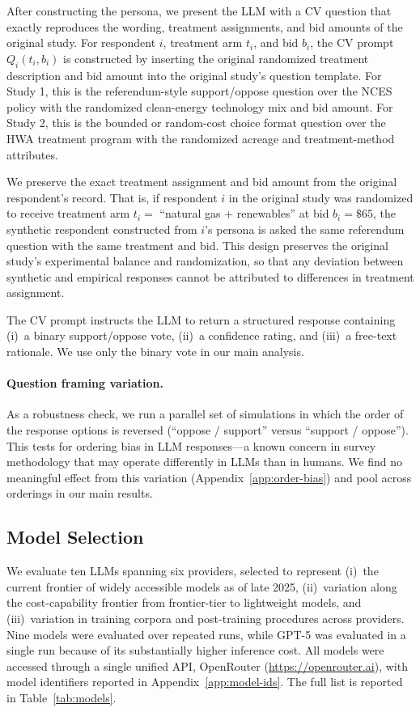 \documentclass[12pt]{article}
\begin{document}
After constructing the persona, we present the LLM with a CV question that
exactly reproduces the wording, treatment assignments, and bid amounts of
the original study. For respondent $i$, treatment arm $t_i$, and bid $b_i$,
the CV prompt $Q_i(t_i, b_i)$ is constructed by inserting the original
randomized treatment description and bid amount into the original study's
question template. For Study 1, this is the referendum-style support/oppose
question over the NCES policy with the randomized clean-energy technology
mix and bid amount. For Study 2, this is the bounded or random-cost choice
format question over the HWA treatment program with the randomized acreage
and treatment-method attributes.

We preserve the exact treatment assignment and bid amount from the original
respondent's record. That is, if respondent $i$ in the original study was
randomized to receive treatment arm $t_i = $ ``natural gas + renewables''
at bid $b_i = \$65$, the synthetic respondent constructed from $i$'s
persona is asked the same referendum question with the same treatment and
bid. This design preserves the original study's experimental balance and
randomization, so that any deviation between synthetic and empirical
responses cannot be attributed to differences in treatment assignment.

The CV prompt instructs the LLM to return a structured response containing
(i)~a binary support/oppose vote, (ii)~a confidence rating, and (iii)~a
free-text rationale. We use only the binary vote in our main analysis.

\paragraph{Question framing variation.} As a robustness check, we run a
parallel set of simulations in which the order of the response options is
reversed (``oppose / support'' versus ``support / oppose''). This tests
for ordering bias in LLM responses---a known concern in survey methodology
that may operate differently in LLMs than in humans. We find no meaningful
effect from this variation (Appendix~\ref{app:order-bias}) and pool across
orderings in our main results.

\subsection{Model Selection}\label{sec:methods-models}

We evaluate ten LLMs spanning six providers, selected to represent
(i)~the current frontier of widely accessible models as of late 2025,
(ii)~variation along the cost-capability frontier from frontier-tier to
lightweight models, and (iii)~variation in training corpora and
post-training procedures across providers. Nine models were evaluated
over repeated runs, while GPT-5 was evaluated in a single run because
of its substantially higher inference cost. All models were accessed
through a single unified API, OpenRouter
(\url{https://openrouter.ai}), with model identifiers reported in
Appendix~\ref{app:model-ids}. The full list is reported in
Table~\ref{tab:models}.
\end{document}
